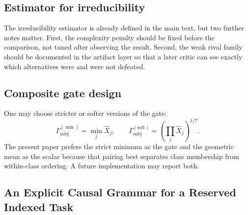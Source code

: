 \documentclass[11pt,a4paper]{article}
\theoremstyle{definition}
\newcommand{\GateSubj}{\Gamma_{\mathrm{subj}}}
\begin{document}
\subsection{Estimator for irreducibility}
The irreducibility estimator is already defined in the main text, but two further notes matter. First, the complexity penalty should be fixed before the comparison, not tuned after observing the result. Second, the weak rival family should be documented in the artifact layer so that a later critic can see exactly which alternatives were and were not defeated.

\subsection{Composite gate design}
One may choose stricter or softer versions of the gate:
\[
\GateSubj^{(\min)}=\min_j \widehat{X}_j,\qquad
\GateSubj^{(\mathrm{soft})}=\left(\prod_j \widehat{X}_j\right)^{1/7}.
\]
The present paper prefers the strict minimum as the gate and the geometric mean as the scalar because that pairing best separates class membership from within-class ordering. A future implementation may report both.

\subsection{An Explicit Causal Grammar for a Reserved Indexed Task}
\end{document}
